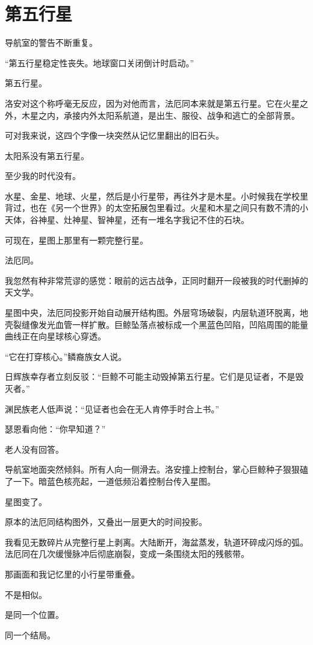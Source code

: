 \chapter{第五行星}

导航室的警告不断重复。

“第五行星稳定性丧失。地球窗口关闭倒计时启动。”

第五行星。

洛安对这个称呼毫无反应，因为对他而言，法厄同本来就是第五行星。它在火星之外，木星之内，承接内外太阳系航道，是出生、服役、战争和逃亡的全部背景。

可对我来说，这四个字像一块突然从记忆里翻出的旧石头。

太阳系没有第五行星。

至少我的时代没有。

水星、金星、地球、火星，然后是小行星带，再往外才是木星。小时候我在学校里背过，也在《另一个世界》的太空拓展包里看过。火星和木星之间只有数不清的小天体，谷神星、灶神星、智神星，还有一堆名字我记不住的石块。

可现在，星图上那里有一颗完整行星。

法厄同。

我忽然有种非常荒谬的感觉：眼前的远古战争，正同时翻开一段被我的时代删掉的天文学。

星图中央，法厄同投影开始自动展开结构图。外层穹场破裂，内层轨道环脱离，地壳裂缝像发光血管一样扩散。巨鲸坠落点被标成一个黑蓝色凹陷，凹陷周围的能量曲线正在向星球核心穿透。

“它在打穿核心。”鳞裔族女人说。

日辉族幸存者立刻反驳：“巨鲸不可能主动毁掉第五行星。它们是见证者，不是毁灭者。”

渊民族老人低声说：“见证者也会在无人肯停手时合上书。”

瑟恩看向他：“你早知道？”

老人没有回答。

导航室地面突然倾斜。所有人向一侧滑去。洛安撞上控制台，掌心巨鲸种子狠狠磕了一下。暗蓝色核亮起，一道低频沿着控制台传入星图。

星图变了。

原本的法厄同结构图外，又叠出一层更大的时间投影。

我看见无数碎片从完整行星上剥离。大陆断开，海盆蒸发，轨道环碎成闪烁的弧。法厄同在几次缓慢脉冲后彻底崩裂，变成一条围绕太阳的残骸带。

那画面和我记忆里的小行星带重叠。

不是相似。

是同一个位置。

同一个结局。

